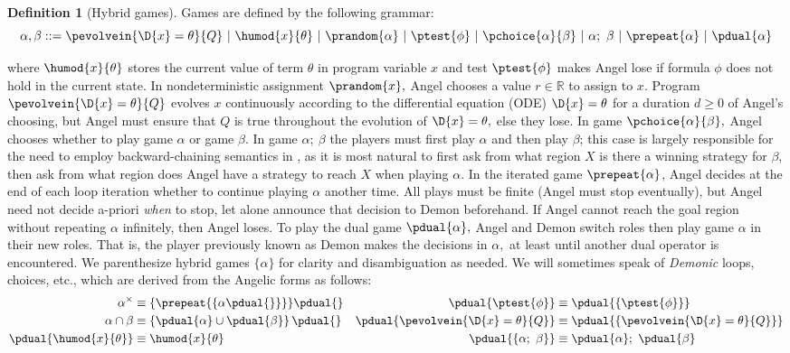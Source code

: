 \documentclass[12pt]{cmuthesis}
\theoremstyle{definition}
\newtheorem{definition}{Definition}
\theoremstyle{remark}
\newcommand{\bebecomes}{\mathrel{::=}}
\newcommand{\alternative}{~|~}
\newcommand{\ivr}{Q}
\begin{document}
\begin{definition}[Hybrid games]
Games are defined by the following grammar:  
\[\alpha,\beta \bebecomes \pevolvein{\D{x}=\theta}{\ivr} \alternative \humod{x}{\theta} \alternative \prandom{\alpha} \alternative \ptest{\phi} \alternative \pchoice{\alpha}{\beta} \alternative \alpha;~\beta \alternative \prepeat{\alpha} \alternative \pdual{\alpha}\]
\end{definition} 
where $\humod{x}{\theta}$ stores the current value of term $\theta$ in program variable $x$  and test $\ptest{\phi}$ makes Angel lose if formula $\phi$ does not hold in the current state.
In nondeterministic assignment $\prandom{x},$ Angel chooses a value $r \in \mathbb{R}$ to assign to $x$.
Program $\pevolvein{\D{x}=\theta}{\ivr}$ evolves $x$ continuously according to the differential equation (ODE) $\D{x}=\theta$ for a duration $d \geq 0$ of Angel's choosing, but Angel must ensure that $\ivr$ is true throughout the evolution of $\D{x}=\theta,$ else they lose.
In game $\pchoice{\alpha}{\beta},$ Angel chooses whether to play game $\alpha$ or game $\beta$.
In game $\alpha;~\beta$ the players must first play $\alpha$ and then play $\beta$; this case is largely responsible for the need to employ backward-chaining semantics in \dGL, as it is most natural to first ask from what region $X$ is there a winning strategy for $\beta$, then ask from what region does Angel have a strategy to reach $X$ when playing $\alpha$.
In the iterated game $\prepeat{\alpha}$, Angel decides at the end of each loop iteration whether to continue playing $\alpha$ another time.
All plays must be finite (Angel must stop eventually), but Angel need not decide a-priori \emph{when} to stop, let alone announce that decision to Demon beforehand.
If Angel cannot reach the goal region without repeating $\alpha$ infinitely, then Angel loses.
To play the dual game $\pdual{\alpha},$ Angel and Demon switch roles then play game $\alpha$ in their new roles.
That is, the player previously known as Demon makes the decisions in $\alpha,$ at least until another dual operator is encountered.
We parenthesize hybrid games $\{ \alpha \}$ for clarity and disambiguation as needed.
We will sometimes speak of \emph{Demonic} loops, choices, etc., which are derived from the Angelic forms as follows:
\begin{align*}
\alpha^\times &\equiv \{\prepeat{\{{\alpha{}\pdual{}}\}}\}{\pdual{}}                 & \pdual{\ptest{\phi}}      &\equiv \pdual{\{\ptest{\phi}\}}\\
\alpha \cap \beta  &\equiv \left\{\pdual{\alpha} \cup \pdual{\beta}\right\}\pdual{} & \pdual{\pevolvein{\D{x}=\theta}{\ivr}} &\equiv \pdual{\{\pevolvein{\D{x}=\theta}{\ivr}\}}\\
\pdual{\humod{x}{\theta}} &\equiv \humod{x}{\theta}                                      & \pdual{\{\alpha;~\beta\}} &\equiv \pdual{\alpha};~\pdual{\beta} 
\end{align*}
\end{document}
